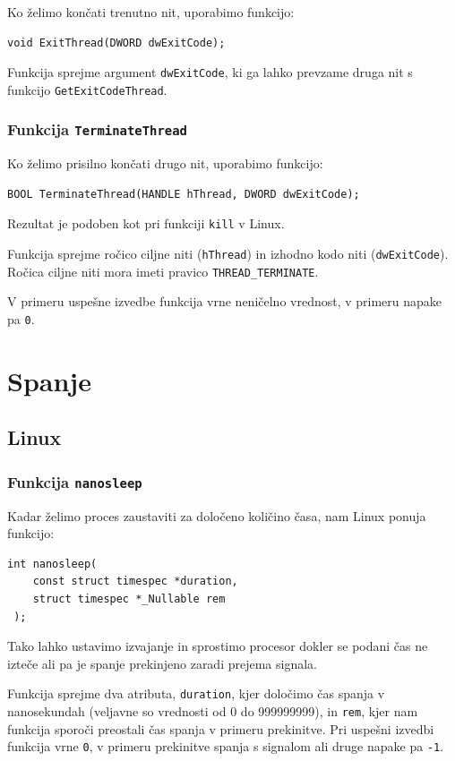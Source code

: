\documentclass[a4paper,12pt,openright]{book}
\begin{document}
Ko želimo končati trenutno nit, uporabimo funkcijo:
\begin{lstlisting}[style=func]
 void ExitThread(DWORD dwExitCode);
\end{lstlisting}

Funkcija sprejme argument \texttt{dwExitCode}, ki ga lahko prevzame druga nit s funkcijo \texttt{GetExitCodeThread}.

\subsubsection{Funkcija \texttt{TerminateThread}}

Ko želimo prisilno končati drugo nit, uporabimo funkcijo:
\begin{lstlisting}[style=func]
 BOOL TerminateThread(HANDLE hThread, DWORD dwExitCode);
\end{lstlisting}
Rezultat je podoben kot pri funkciji \texttt{kill} v Linux.

Funkcija sprejme ročico ciljne niti (\texttt{hThread}) in izhodno kodo niti (\texttt{dwExit\-Code}).
Ročica ciljne niti mora imeti pravico \texttt{THREAD\_TERMINATE}.

V primeru uspešne izvedbe funkcija vrne neničelno vrednost, v primeru napake pa \texttt{0}.

\section{Spanje}

\subsection{Linux}

\subsubsection{Funkcija \texttt{nanosleep}}

Kadar želimo proces zaustaviti za določeno količino časa, nam Linux ponuja funkcijo:
\begin{lstlisting}[style=func]
 int nanosleep(
	const struct timespec *duration,
	struct timespec *_Nullable rem
 );
\end{lstlisting}
Tako lahko ustavimo izvajanje in sprostimo procesor dokler se podani čas ne izteče ali pa je spanje prekinjeno zaradi prejema signala.

Funkcija sprejme dva atributa, \texttt{duration}, kjer določimo čas spanja v nanosekundah (veljavne so vrednosti od 0 do 999999999), in \texttt{rem}, kjer nam funkcija sporoči preostali čas spanja v primeru prekinitve.
Pri uspešni izvedbi funkcija vrne \texttt{0}, v primeru prekinitve spanja s signalom ali druge napake pa \texttt{-1}.
\end{document}

